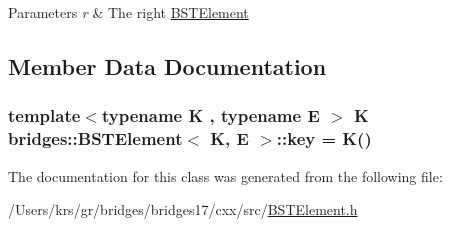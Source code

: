 \begin{DoxyParams}{Parameters}
{\em r} & The right \hyperlink{classbridges_1_1_b_s_t_element}{B\+S\+T\+Element} \\
\hline
\end{DoxyParams}


\subsection{Member Data Documentation}
\hypertarget{classbridges_1_1_b_s_t_element_aebe8a0958484a0e28e777b423079bae2}{}
\subsubsection[{key}]{\setlength{\rightskip}{0pt plus 5cm}template$<$typename K , typename E $>$ K {\bf bridges\+::\+B\+S\+T\+Element}$<$ K, E $>$\+::key = K()\hspace{0.3cm}{\ttfamily [protected]}}\label{classbridges_1_1_b_s_t_element_aebe8a0958484a0e28e777b423079bae2}


The documentation for this class was generated from the following file\+:\begin{DoxyCompactItemize}
\item 
/\+Users/krs/gr/bridges/bridges17/cxx/src/\hyperlink{_b_s_t_element_8h}{B\+S\+T\+Element.\+h}\end{DoxyCompactItemize}
